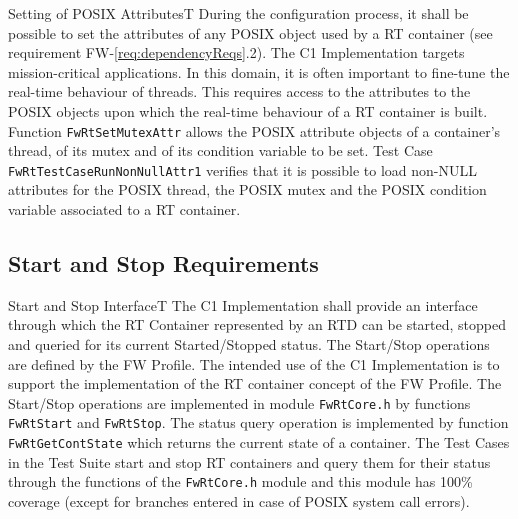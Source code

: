 \documentclass[requirements]{../fwprofile}
\begin{document}
\begin{fw_req}{Setting of POSIX Attributes}{T}
{During the configuration process, it shall be possible to set the attributes of any POSIX object used by a RT container (see requirement FW-\ref{req:dependencyReqs}.2).}
{ The C1 Implementation targets mission-critical applications. In this domain, it is often important to fine-tune the real-time behaviour of threads. This requires access to the attributes to the POSIX objects upon which the real-time behaviour of a RT container is built.}
{ Function \texttt{FwRtSetMutexAttr} allows the POSIX attribute objects of a container's thread, of its mutex and of its condition variable to be set. } 
{ Test Case \texttt{FwRtTestCaseRunNonNullAttr1} verifies that it is possible to load non-NULL attributes for the POSIX thread, the POSIX mutex and the POSIX condition variable associated to a RT container.}
\end{fw_req}

\subsection{Start and Stop Requirements}\label{req:startStopInterfaceRTD}

\begin{fw_req}{Start and Stop Interface}{T}
{ The C1 Implementation shall provide an interface through which the  RT Container represented by an RTD can be started, stopped and queried for its current Started/Stopped status.}
{The Start/Stop operations are defined by the FW Profile. The intended use of the C1 Implementation is to support the implementation of the RT container concept of the FW Profile.}
{The Start/Stop operations are implemented in module \texttt{FwRtCore.h} by functions \texttt{FwRtStart} and \texttt{FwRtStop}. The status query operation is implemented by function \texttt{FwRtGetContState} which returns the current state of a container.} 
{The Test Cases in the Test Suite start and stop RT containers and query them for their status through the functions of the \texttt{FwRtCore.h} module and this module has 100\% coverage (except for branches entered in case of POSIX system call errors).}
\end{fw_req}
\end{document}

